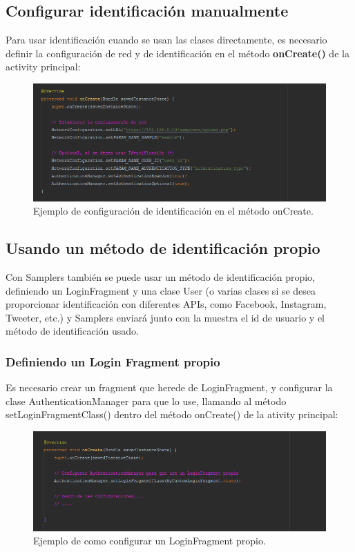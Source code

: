 \subsection{Configurar identificación manualmente} \label{sec:identificacion_manual}

Para usar identificación cuando se usan las clases directamente, es necesario definir la configuración de red y de identificación en el método \textbf{onCreate()} de la activity principal:

\begin{figure}[H]
  \centering
    \includegraphics[scale=0.6]{50-anexos/B-uso/identificacion_manual.png} 
    \caption{Ejemplo de configuración de identificación en el método onCreate.}
\end{figure}	


\subsection{Usando un método de identificación propio} \label{sec:usar_auth_propia}

Con Samplers también se puede usar un método de identificación propio, definiendo un LoginFragment y una clase User (o varias clases si se desea proporcionar identificación con diferentes APIs, como Facebook, Instagram, Tweeter, etc.) y Samplers enviará junto con la muestra el id de usuario y el método de identificación usado.


\subsubsection{Definiendo un Login Fragment propio}

Es necesario crear un fragment que herede de LoginFragment, y configurar la clase AuthenticationManager para que lo use, llamando al método setLoginFragmentClass() dentro del método onCreate() de la ativity principal:

\begin{figure}[H]
  \centering
    \includegraphics[scale=0.6]{50-anexos/B-uso/identificacion_propio_configurar.png} 
    \caption{Ejemplo de como configurar un LoginFragment propio.}
\end{figure}	


